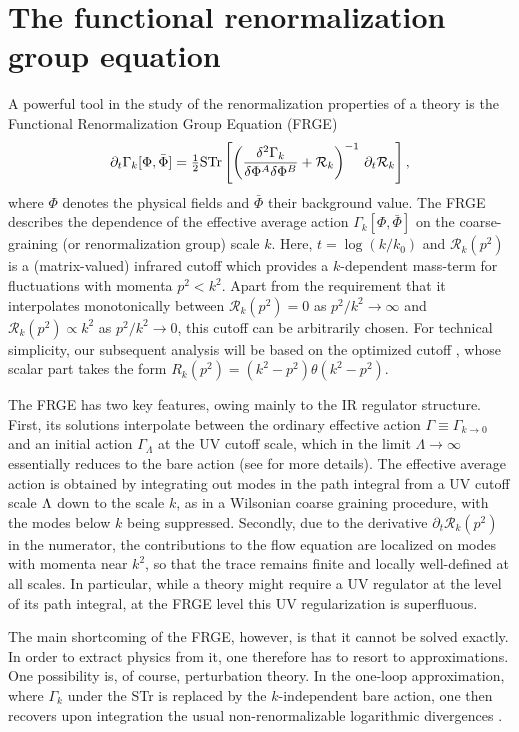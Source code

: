 \documentclass[preprint,preprintnumbers,amsmath,amssymb,nofootinbib,APS]{revtex4}
\newcommand{\be}{\begin{equation}}
\newcommand{\ee}{\end{equation}}
\newcommand{\cR}{\mathcal{R}}
\newcommand{\2}{\sqrt{2\,}}
\newcommand{\half}{\tfrac{1}{2}}
\newcommand{\p}{\partial}
\begin{document}
\section{The functional renormalization group equation}
\label{sec:FRGE}
A powerful tool in the study of the renormalization properties of a theory is the Functional Renormalization Group Equation (FRGE)  \cite{Wetterich:1992yh}
%
\be\label{FRGE}
\p_t \Gamma_k[\Phi, \bar{\Phi}] = \half {\rm STr} \left[ \left( \frac{\delta^{2} \Gamma_k}{\delta \Phi^A \delta \Phi^B } + \cR_k \right)^{-1} \, \p_t \cR_k  \right]\\,
\ee
%
where $\Phi$ denotes the physical fields and $\bar{\Phi}$ their background value.
The FRGE describes the dependence of the effective average action $\Gamma_k[\Phi, \bar{\Phi}]$ on the coarse-graining (or renormalization group) scale $k$. Here, $t = \log(k/k_0)$ and $\cR_k(p^2)$ is a (matrix-valued) infrared cutoff which provides a $k$-dependent mass-term for fluctuations with momenta $p^2<k^2$.  Apart from the requirement that it interpolates monotonically between $\cR_k (p^2) = 0$ as $p^2/k^2 \rightarrow \infty$ and $\cR_k (p^2) \propto k^2$ as $p^2/k^2 \rightarrow 0$, this cutoff can be arbitrarily chosen. For technical simplicity, our subsequent analysis will be based on the optimized cutoff \cite{Litim:2001up}, whose scalar part takes the form $R_k(p^2) = (k^2 - p^2) \theta(k^2 - p^2)$.

The FRGE has two key features, owing mainly to the IR regulator structure. First, its solutions interpolate between the ordinary effective action $\Gamma \equiv \Gamma_{k \rightarrow 0}$ and an initial action $\Gamma_\Lambda$ at the UV cutoff scale, 
which  in the limit $\Lambda \rightarrow \infty$ essentially reduces to the bare action (see \cite{Manrique:2008zw} for more details). The effective average action is  obtained by integrating out modes in the path integral from a UV cutoff scale $\Lambda$ down to the scale $k$, as in a Wilsonian coarse graining procedure, with the modes below $k$ being suppressed. Secondly, due to the derivative $\p_t \cR_k(p^2)$ in the numerator, the contributions to the flow equation are localized on modes with momenta near $k^2$, so that the trace remains finite and locally well-defined at all scales. In particular, while a theory might require a UV regulator at the level of its path integral, at the FRGE level this UV regularization is superfluous. 

The main shortcoming of the FRGE, however, is that it cannot be solved exactly.
In order to extract physics from it, one therefore has to resort to approximations.
One possibility is, of course, perturbation theory. In the one-loop approximation, where $\Gamma_k$ under the STr is replaced by the $k$-independent bare action, 
 one then recovers upon integration the usual non-renormalizable logarithmic divergences \cite{Codello:2008vh}.
\end{document}
